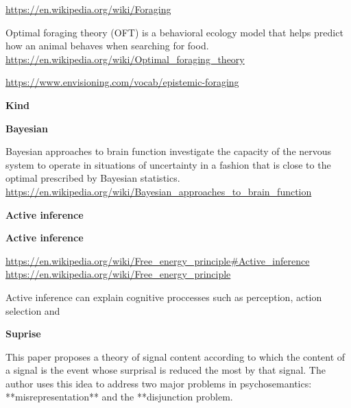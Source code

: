 \documentclass{book}
\providecommand{\ProjectDeepHeading}[2]{%
    \par\medskip\noindent\textbf{#2}\par\smallskip
}
\providecommand{\ProjectSafeIncludePdf}[2][]{}
\begin{document}

\url{https://en.wikipedia.org/wiki/Foraging}
    
    Optimal foraging theory (OFT) is a behavioral ecology model that helps predict how an animal behaves when searching for food.
    \url{https://en.wikipedia.org/wiki/Optimal_foraging_theory}
    
    \url{https://www.envisioning.com/vocab/epistemic-foraging}

\ProjectDeepHeading{4}{Kind}


%

\ProjectDeepHeading{5}{Bayesian}


Bayesian approaches to brain function investigate the capacity of the nervous system to operate in situations of uncertainty in a fashion that is close to the optimal prescribed by Bayesian statistics. \url{https://en.wikipedia.org/wiki/Bayesian_approaches_to_brain_function}

\ProjectDeepHeading{6}{Active inference}


\ProjectDeepHeading{12}{Active inference}
    \url{https://en.wikipedia.org/wiki/Free_energy_principle\#Active_inference}
    \url{https://en.wikipedia.org/wiki/Free_energy_principle}
    \ProjectSafeIncludePdf[pages=-, fitpaper=true]{../assets/proposed/robot/structure/mind/active_inference.pdf}
    Active inference can explain cognitive proccesses such as perception, action selection and


% 

\ProjectDeepHeading{7}{Suprise}


\cite{weissglass-2019-greatest-surprise-reduction-semantics-an-information-theoretic-solution-to-misrepresentation-and-disjunction} This paper proposes a theory of signal content according to which the content of a signal is the event whose surprisal is reduced the most by that signal. The author uses this idea to address two major problems in psychosemantics: **misrepresentation** and the **disjunction problem.
\end{document}
